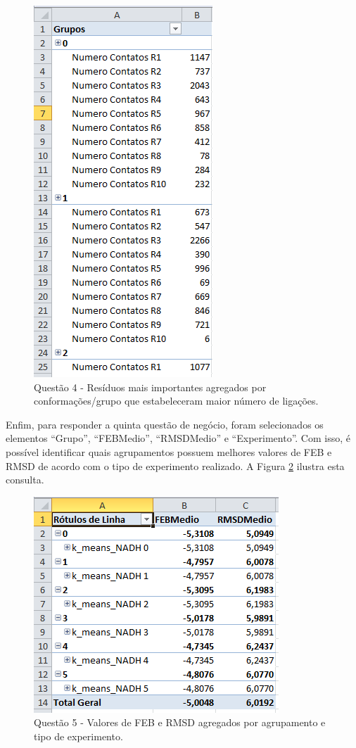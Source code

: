 \begin{figure}[h]
        \center
        \includegraphics[scale=0.7]{images/Questao4.PNG}
        \caption{Questão 4 - Resíduos mais importantes agregados por conformações/grupo que estabeleceram maior número de ligações.}
        \label{fig:questao4}
\end{figure}

Enfim, para responder a quinta questão de negócio, foram selecionados os elementos ``Grupo'', ``FEBMedio'', ``RMSDMedio'' e ``Experimento''. Com isso, é possível identificar quais agrupamentos possuem melhores valores de FEB e RMSD de acordo com o tipo de experimento realizado. A Figura \ref{fig:questao5} ilustra esta consulta.

\begin{figure}[h]
        \center
        \includegraphics[scale=0.8]{images/Questao5.PNG}
        \caption{Questão 5 - Valores de FEB e RMSD agregados por agrupamento e tipo de experimento.}
        \label{fig:questao5}
\end{figure}

